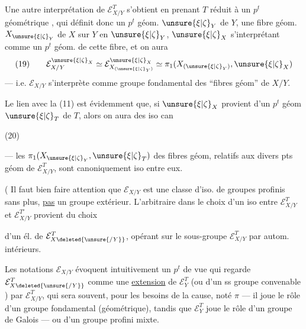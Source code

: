 Une autre interprétation de $\mathcal E_{X/Y}^T$ s'obtient en prenant $T$ réduit à un $p^t$ géométrique , qui définit donc un $p^t$ géom. $\unsure{\xi|\zeta}_Y$ de $Y$, une fibre géom. $X_{\unsure{\xi|\zeta}_Y}$ de $X$ sur $Y$ en $\unsure{\xi|\zeta}_Y$, $\unsure{\xi|\zeta}_X$ s'interprétant comme un $p^t$ géom. de cette fibre, et on aura
\[
(19)\qquad \mathcal E_{X/Y}^{\unsure{\xi|\zeta}_X}\simeq\mathcal E_{X_{(\unsure{\xi|\zeta}_Y)}}^{\unsure{\xi|\zeta}_X}\simeq\pi_1(X_{(\unsure{\xi|\zeta}_Y)},\unsure{\xi|\zeta}_X)
\]
--- i.e. $\mathcal E_{X/Y}$ s'interprète comme groupe fondamental des ``fibres géom'' de $X/Y$.


Le lien avec la  (11) est évidemment que, si $\unsure{\xi|\zeta}_X$ provient d'un $p^t$ géom $\unsure{\xi|\zeta}_T$ de $T$, alors on aura des iso can

(20)\quad
{}

 --- les $\pi_1(X_{\unsure{\xi|\zeta}_Y},\unsure{\xi|\zeta}_T)$ des fibres géom, relatifs aux divers pts géom de $\mathcal E_{X/Y}^T$, sont canoniquement iso entre eux.

( Il faut bien faire attention que $\mathcal E_{X/Y}$  est une classe d'iso. de groupes profinis sans plus, \uline{pas} un groupe extérieur. L'arbitraire dans le choix d'un iso entre $\mathcal E_{X/Y}^T$ et $\mathcal E_{X/Y}^{T'}$ provient du choix


d'un él. de $\mathcal E_{X\deleted{\unsure{/Y}}}^T$, opérant sur le sous-groupe $\mathcal E_{X/Y}^T$ par autom. intérieurs.

Les notations  $\mathcal E_{X/Y}$ évoquent intuitivement un $p^t$ de vue qui regarde $\mathcal E_{X\deleted{\unsure{/Y}}}^T$ comme une \uline{extension} de $\mathcal E_Y^T$ (ou d'un ss groupe convenable ) par $\mathcal E_{X/Y}^T$, qui sera souvent, pour les besoins de la cause, noté $\pi$ --- il joue le rôle d'un groupe fondamental (géométrique), tandis que $\mathcal E_Y^T$ joue le rôle d'un groupe de Galois --- ou d'un groupe profini mixte.

